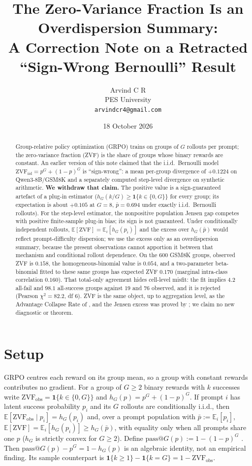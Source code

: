 \documentclass[11pt]{article}
\title{The Zero-Variance Fraction Is an Overdispersion Summary:\\
\large A Correction Note on a Retracted ``Sign-Wrong Bernoulli'' Result}
\author{Arvind C R\\
PES University\\\texttt{arvindcr4@gmail.com}}
\date{18 October 2026}
\begin{document}
\maketitle

\begin{abstract}
Group-relative policy optimization (GRPO) trains on groups of $G$ rollouts per
prompt; the zero-variance fraction (ZVF) is the share of groups whose binary
rewards are constant. An earlier version of this note claimed that the i.i.d.\
Bernoulli model $\mathrm{ZVF}_{\mathrm{iid}}=p^G+(1-p)^G$ is ``sign-wrong'':
a mean per-group divergence of $+0.1224$ on Qwen3-8B/GSM8K and a separately
computed step-level divergence on synthetic arithmetic. \textbf{We withdraw that
claim.} The positive value is a sign-guaranteed artefact of a plug-in estimator
($h_G(k/G)\ge\mathbf{1}\{k\in\{0,G\}\}$ for every group; its expectation is
about $+0.105$ at $G=8$, $\bar p=0.694$ under exactly i.i.d.\ Bernoulli rollouts).
For the step-level estimator, the nonpositive population Jensen gap competes
with positive finite-sample plug-in bias; its sign is not guaranteed.
Under conditionally independent rollouts,
$\mathbb{E}[\mathrm{ZVF}]=\mathbb{E}_i[h_G(p_i)]$ and the excess over
$h_G(\bar p)$ would reflect prompt-difficulty dispersion; we use the excess only
as an overdispersion summary, because the present observations cannot apportion
it between that mechanism and conditional rollout dependence.
On the 600 GSM8K groups, observed ZVF is $0.158$, the homogeneous-binomial
value is $0.054$, and a two-parameter beta-binomial fitted to these same groups
has expected ZVF $0.170$ (marginal intra-class correlation $0.160$). That
total-only agreement hides cell-level misfit: the fit implies $4.2$ all-fail and
$98.1$ all-success groups against $19$ and $76$ observed, and it is rejected
(Pearson $\chi^2=82.2$, df $6$). ZVF is the same object, up to aggregation
level, as the Advantage Collapse Rate of \citet{he2026advantage},
and the Jensen excess was proved by \citet{nie2026gradstarvation}; we claim no
new diagnostic or theorem.
\end{abstract}

\section{Setup}

GRPO \citep{shao2024deepseekmath} centres each reward on its group mean, so a
group with constant rewards contributes no gradient.
For a group of $G\ge2$ binary rewards with $k$ successes write
$\mathrm{ZVF}_{\mathrm{obs}}=\mathbf{1}\{k\in\{0,G\}\}$ and
$h_G(p)=p^G+(1-p)^G$. If prompt $i$ has latent success probability $p_i$ and
its $G$ rollouts are conditionally i.i.d., then
$\mathbb{E}[\mathrm{ZVF}_{\mathrm{obs}}\mid p_i]=h_G(p_i)$ and, over a prompt
population with $\bar p:=\mathbb E_i[p_i]$,
$\mathbb{E}[\mathrm{ZVF}]=\mathbb{E}_i[h_G(p_i)]\ge h_G(\bar p)$,
with equality only when all prompts share one $p$ ($h_G$ is strictly convex
for $G\ge2$). Define $\mathrm{pass@}G(p):=1-(1-p)^G$ \citep{chen2021codex}.
Then $\mathrm{pass@}G(p)-p^G=1-h_G(p)$ is an algebraic identity, not an
empirical finding. Its sample counterpart is
$\mathbf1\{k\ge1\}-\mathbf1\{k=G\}=1-\mathrm{ZVF}_{\mathrm{obs}}$.
\end{document}
